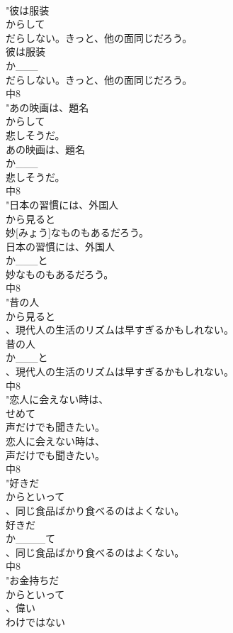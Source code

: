 \documentclass[8pt]{extreport}
\begin{document}
\begin{CJK}{UTF8}{min}
\\	"彼は服装
\\	からして
\\	だらしない。きっと、他の面同じだろう。
\\	彼は服装
\\	か___
\\	だらしない。きっと、他の面同じだろう。
\\	中8
\\	"あの映画は、題名
\\	からして
\\	悲しそうだ。
\\	あの映画は、題名
\\	か___
\\	悲しそうだ。
\\	中8
\\	"日本の習慣には、外国人
\\	から見ると
\\	妙[みょう]なものもあるだろう。
\\	日本の習慣には、外国人
\\	か___と
\\	妙なものもあるだろう。
\\	中8
\\	"昔の人
\\	から見ると
\\	、現代人の生活のリズムは早すぎるかもしれない。
\\	昔の人
\\	か___と
\\	、現代人の生活のリズムは早すぎるかもしれない。
\\	中8
\\	"恋人に会えない時は、
\\	せめて
\\	声だけでも聞きたい。
\\	恋人に会えない時は、
\\	声だけでも聞きたい。
\\	中8
\\	"好きだ
\\	からといって
\\	、同じ食品ばかり食べるのはよくない。
\\	好きだ
\\	か____て
\\	、同じ食品ばかり食べるのはよくない。
\\	中8
\\	"お金持ちだ
\\	からといって
\\	、偉い
\\	わけではない

\end{CJK}
\end{document}
